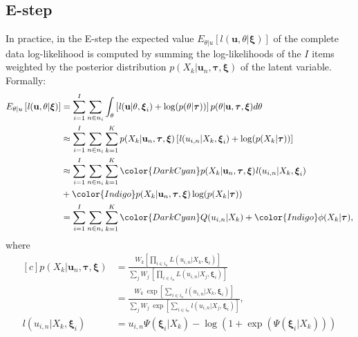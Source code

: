 \subsection{E-step} 

In practice, in the E-step the expected value $E_{\theta|u}\left[\mathit{l}(\mathbf{u},\theta|\boldsymbol{\xi})\right]$ of the complete data log-likelihood is computed by summing the log-likelihoods of the $I$ items weighted by the posterior distribution  $p(X_k|\mathbf{u}_n,\boldsymbol{\tau},\boldsymbol{\xi})$ of the latent variable. Formally:
\begin{equation}\label{eq:expect}
\begin{aligned}
E_{\theta|u}\left[\mathit{l}(\mathbf{u},\theta|\boldsymbol{\xi})\right] & =\sum_{i=1}^{I}{ \sum_{n \in n_i}{\int_{\theta}{\left[\mathit{l}(\mathbf{u}|\theta,\boldsymbol{\xi}_i)+\log(p(\theta|\boldsymbol{\tau}))\right]p(\theta|\mathbf{u},\boldsymbol{\tau},\boldsymbol{\xi})} d\theta}} \\
& \approx \sum_{i=1}^{I}{\sum_{n \in n_i}{\sum_{k=1}^K {p(X_k|\mathbf{u}_n,\boldsymbol{\tau},\boldsymbol{\xi})\left[\mathit{l}(u_{i,n}|X_k,\boldsymbol{\xi}_i)+\log(p(X_k|\boldsymbol{\tau})) \right]}}} \\
& \approx \sum_{i=1}^{I}\sum_{n \in n_i}{\sum_{k=1}^K {{\color{DarkCyan}p(X_k|\mathbf{u}_n,\boldsymbol{\tau},\boldsymbol{\xi})\mathit{l}(u_{i,n}|X_k,\boldsymbol{\xi}_i)}}} \\
& +{\color{Indigo}p(X_k|\mathbf{u}_n,\boldsymbol{\tau},\boldsymbol{\xi})\log(p(X_k|\boldsymbol{\tau}))} \\
& =\sum_{i=1}^{I}{\sum_{n \in n_i}{\sum_{k=1}^K{{\color{DarkCyan}Q(u_{i,n}|X_k)}+{\color{Indigo}\phi(X_k|\boldsymbol{\tau})}}}},
\end{aligned}
\end{equation}
where
\begin{equation}\label{eq:expectation}
\begin{aligned}[c]
p(X_k|\mathbf{u}_n,\boldsymbol{\tau},\boldsymbol{\xi}) & = \frac{W_k\left[ \prod_{i \in i_n}{L(u_{i,n}|X_k,\boldsymbol{\xi}_i)}\right]}{\sum_j{W_j \ \left[ \prod_{i \in i_n}{L(u_{i,n}|X_j,\boldsymbol{\xi}_i)}\right]}} \\
& = \frac{W_k \ \exp\left[ \sum_{i \in i_n}{\mathit{l}(u_{i,n}|X_k,\boldsymbol{\xi}_i)}\right]}{\sum_j{W_j \ \exp\left[ \sum_{i \in i_n}{\mathit{l}(u_{i,n}|X_j,\boldsymbol{\xi}_i)}\right]}}, \\
\mathit{l}(u_{i,n}|X_k,\boldsymbol{\xi}_i) &=u_{i,n} \Psi(\boldsymbol{\xi}_i| X_k)-\log(1+\exp(\Psi(\boldsymbol{\xi}_i|X_k)))
\end{aligned}
\end{equation}

